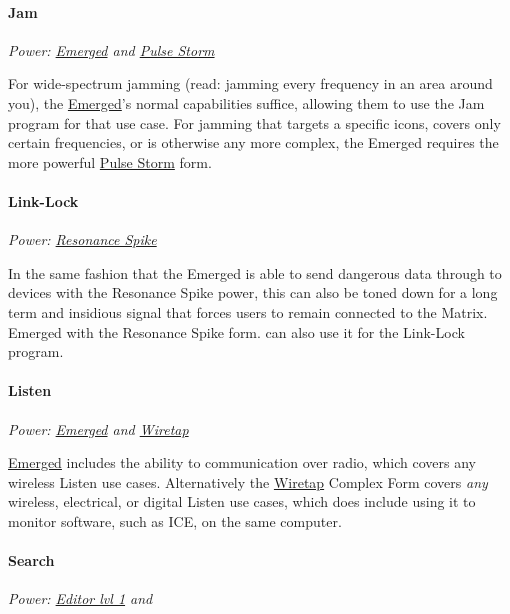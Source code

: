 \begin{multicols*}{3}
	\paragraph{Jam}
	\begin{center}
		\textit{Power: \hyperref[emerged]{Emerged} and \hyperref[pulse_storm]{Pulse Storm}}
	\end{center}

	For wide-spectrum jamming (read: jamming every frequency in an area around you), the \hyperref[emerged]{Emerged}'s normal capabilities suffice, allowing them to use the Jam program for that use case. For jamming that targets a specific icons, covers only certain frequencies, or is otherwise any more complex, the Emerged requires the more powerful \hyperref[pulse_storm]{Pulse Storm} form.
	
	\paragraph{Link-Lock}
	\begin{center}
		\textit{Power: \hyperref[resonance_spike]{Resonance Spike}}
	\end{center}

	In the same fashion that the Emerged is able to send dangerous data through to devices with the Resonance Spike power, this can also be toned down for a long term and insidious signal that forces users to remain connected to the Matrix. Emerged with the Resonance Spike form. can also use it for the Link-Lock program.
	
	\paragraph{Listen}
	\begin{center}
		\textit{Power: \hyperref[emerged]{Emerged} and \hyperref[wiretap]{Wiretap}}
	\end{center}

	\hyperref[emerged]{Emerged} includes the ability to communication over radio, which covers any wireless Listen use cases. Alternatively the \hyperref[wiretap]{Wiretap} Complex Form covers \textit{any} wireless, electrical, or digital Listen use cases, which does include using it to monitor software, such as ICE, on the same computer.
	
	\paragraph{Search}
	\begin{center}
		\textit{Power: \hyperref[editor]{Editor lvl 1} and}
	\end{center}


\end{multicols*}
